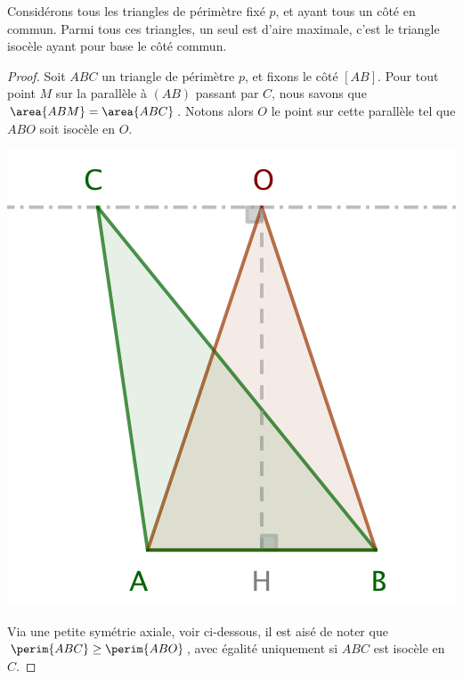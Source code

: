 \begin{fact} \label{tri-one-side-fixed}
	Considérons tous les triangles de périmètre fixé $p$, et ayant tous un côté en commun.
	Parmi tous ces triangles, un seul est d'aire maximale, c'est le triangle isocèle ayant pour base le côté commun.
\end{fact}


\begin{proof}
	Soit $ABC$ un triangle de périmètre $p$, et fixons le côté $[AB]$. 
	Pour tout point $M$ sur la parallèle à $(AB)$ passant par $C$, nous savons que $\area{ABM} = \area{ABC}$. Notons alors $O$ le point sur cette parallèle tel que $ABO$ soit isocèle en $O$.

	\begin{center}
		\includegraphics[scale=.4]{content/triangle-one-side-fixed/triangle.png}
	\end{center}

	
	Via une petite symétrie axiale, voir ci-dessous, il est aisé de noter que $\perim{ABC} \geq \perim{ABO}$, avec égalité uniquement si $ABC$ est isocèle en $C$. 
	

\end{proof}
